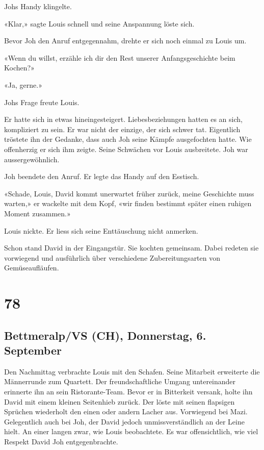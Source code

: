 Johs Handy klingelte.

«Klar,» sagte Louis schnell und seine Anspannung löste sich.

Bevor Joh den Anruf entgegennahm, drehte er sich noch einmal zu Louis
um.

«Wenn du willst, erzähle ich dir den Rest unserer Anfangsgeschichte beim
Kochen?»

«Ja, gerne.»

Johs Frage freute Louis.

Er hatte sich in etwas hineingesteigert. Liebesbeziehungen hatten es an
sich, kompliziert zu sein. Er war nicht der einzige, der sich schwer
tat. Eigentlich tröstete ihn der Gedanke, dass auch Joh seine Kämpfe
ausgefochten hatte. Wie offenherzig er sich ihm zeigte. Seine Schwächen
vor Louis ausbreitete. Joh war aussergewöhnlich.

Joh beendete den Anruf. Er legte das Handy auf den Esstisch.

«Schade, Louis, David kommt unerwartet früher zurück, meine Geschichte
muss warten,» er wackelte mit dem Kopf, «wir finden bestimmt später
einen ruhigen Moment zusammen.»

Louis nickte. Er liess sich seine Enttäuschung nicht anmerken.

Schon stand David in der Eingangstür. Sie kochten gemeinsam. Dabei
redeten sie vorwiegend und ausführlich über verschiedene
Zubereitungsarten von Gemüseaufläufen.

\chapter{78}\label{section-78}

\section{Bettmeralp/VS (CH), Donnerstag, 6.
September}\label{bettmeralpvs-ch-donnerstag-6.-september}

Den Nachmittag verbrachte Louis mit den Schafen. Seine Mitarbeit
erweiterte die Männerrunde zum Quartett. Der freundschaftliche Umgang
untereinander erinnerte ihn an sein Ristorante-Team. Bevor er in
Bitterkeit versank, holte ihn David mit einem kleinen Seitenhieb zurück.
Der löste mit seinen flapsigen Sprüchen wiederholt den einen oder andern
Lacher aus. Vorwiegend bei Mazi. Gelegentlich auch bei Joh, der David
jedoch unmissverständlich an der Leine hielt. An einer langen zwar, wie
Louis beobachtete. Es war offensichtlich, wie viel Respekt David Joh
entgegenbrachte.

